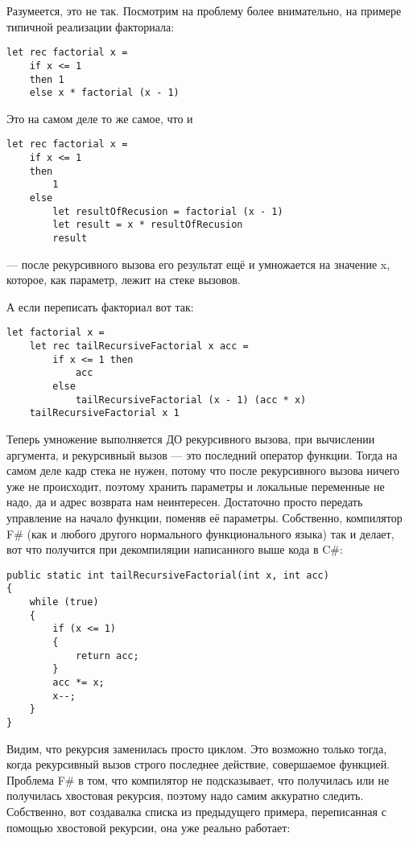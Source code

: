 \documentclass{../../text-style}
\begin{document}
Разумеется, это не так. Посмотрим на проблему более внимательно, на примере типичной реализации факториала:

\begin{verbatim}
let rec factorial x =
    if x <= 1
    then 1 
    else x * factorial (x - 1)
\end{verbatim}

Это на самом деле то же самое, что и 

\begin{verbatim}
let rec factorial x =
    if x <= 1
    then
        1
    else
        let resultOfRecusion = factorial (x - 1)
        let result = x * resultOfRecusion
        result
\end{verbatim}

--- после рекурсивного вызова его результат ещё и умножается на значение x, которое, как параметр, лежит на стеке вызовов.

А если переписать факториал вот так:

\begin{verbatim}
let factorial x =
    let rec tailRecursiveFactorial x acc =
        if x <= 1 then
            acc
        else
            tailRecursiveFactorial (x - 1) (acc * x)
    tailRecursiveFactorial x 1
\end{verbatim}

Теперь умножение выполняется ДО рекурсивного вызова, при вычислении аргумента, и рекурсивный вызов --- это последний оператор функции. Тогда на самом деле кадр стека не нужен, потому что после рекурсивного вызова ничего уже не происходит, поэтому хранить параметры и локальные переменные не надо, да и адрес возврата нам неинтересен. Достаточно просто передать управление на начало функции, поменяв её параметры. Собственно, компилятор F\# (как и любого другого нормального функционального языка) так и делает, вот что получится при декомпиляции написанного выше кода в C\#:

\begin{verbatim}
public static int tailRecursiveFactorial(int x, int acc)
{
    while (true)
    {
        if (x <= 1)
        {
            return acc;
        }
        acc *= x;
        x--;
    }
}
\end{verbatim}

Видим, что рекурсия заменилась просто циклом. Это возможно только тогда, когда рекурсивный вызов строго последнее действие, совершаемое функцией. Проблема F\# в том, что компилятор не подсказывает, что получилась или не получилась хвостовая рекурсия, поэтому надо самим аккуратно следить. Собственно, вот создавалка списка из предыдущего примера, переписанная с помощью хвостовой рекурсии, она уже реально работает:
\end{document}
